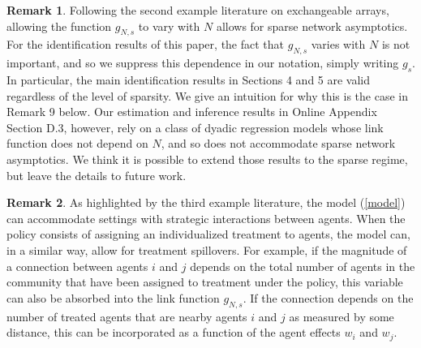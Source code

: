 \documentclass[12pt]{article}
\theoremstyle{definition}
\newtheorem{remark}{Remark}
\begin{document}
\begin{remark}
Following the second example literature on exchangeable arrays, allowing the function $g_{N,s}$ to vary with $N$ allows for sparse network asymptotics. For the identification results of this paper, the fact that $g_{N,s}$ varies with $N$ is not important, and so we suppress this dependence in our notation, simply writing $g_s$. In particular, the main identification results in Sections 4 and 5 are valid regardless of the level of sparsity. We give an intuition for why this is the case in Remark 9 below. Our estimation and inference results in Online Appendix Section D.3, however, rely on a class of dyadic regression models whose link function does not depend on $N$, and so does not accommodate sparse network asymptotics. We think it is possible to extend those results to the sparse regime, but leave the details to future work.  
\end{remark}

\begin{remark}
As highlighted by the third example literature, the model (\ref{model}) can accommodate settings with strategic interactions between agents. When the policy consists of assigning an individualized treatment to agents, the model can, in a similar way, allow for treatment spillovers. For example, if the magnitude of a connection between agents $i$ and $j$ depends on the total number of agents in the community that have been assigned to treatment under the policy, this variable can also be absorbed into the link function $g_{N,s}$. If the connection depends on the number of treated agents that are nearby agents $i$ and $j$ as measured by some distance, this can be incorporated as a function of the agent effects $w_{i}$ and $w_{j}$.  
\end{remark}
\end{document}

